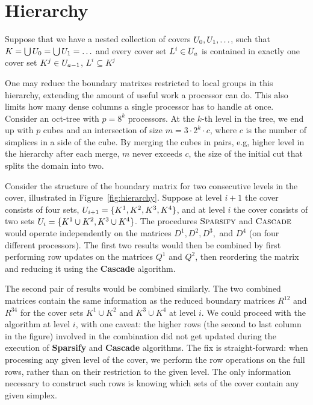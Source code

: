 \section{Hierarchy}
\label{sec:hierarchy}
Suppose that we have a nested collection of
covers $U_0, U_1, \ldots$, such that $K = \bigcup U_0 = \bigcup U_1 = \ldots$
and every cover set $L^i \in U_a$ is contained in exactly one cover set
$K^j \in U_{a-1}$, $L^i \subseteq K^j$

One may reduce the boundary matrixes restricted to local groups in this hierarchy,
extending the amount of useful work a processor can do. This also limits how
many dense columns a single processor has to handle at once.
%
Consider an oct-tree with $p = 8^k$ processors. At the $k$-th level in the
tree, we end up with $p$ cubes and an intersection of size $m = 3 \cdot 2^k \cdot c$,
where $c$ is the number of simplices in a side of the cube. By merging the cubes in pairs, e.g,  higher level
in the hierarchy after each merge, $m$ never exceeds $c$, the size of the
initial cut that splits the domain into two.

Consider the structure of the boundary matrix for two consecutive levels in the
cover, illustrated in Figure~\ref{fig:hierarchy}. Suppose at level $i+1$ the
cover consists of four sets, $U_{i+1} = \{ K^1, K^2, K^3, K^4 \}$, and at level
$i$ the cover consists of two sets $U_i = \{ K^1 \cup K^2, K^3 \cup K^4 \}$.
%
The procedures $\textnormal{\scshape Sparsify}$ and $\textnormal{\scshape Cascade}$ would operate independently
on the matrices $D^1, D^2, D^3,$ and $D^4$ (on four different processors). The first
two results would then be combined by first performing row updates on the matrices $Q^1$ and
$Q^2$, then reordering the matrix and reducing it using the {\bf Cascade}
algorithm.

The second pair of results would be combined similarly.
The two combined matrices contain the same information as the reduced boundary
matrices $R^{12}$ and $R^{34}$ for the cover sets $K^1 \cup K^2$
and $K^3 \cup K^4$ at level $i$. We could proceed with the algorithm at level
$i$, with one caveat: the higher rows (the second to last column in the figure)
involved in the combination did not get updated during the execution of {\bf
Sparsify} and {\bf Cascade} algorithms. The fix is straight-forward: when
processing any given level of the cover, we perform the row operations on the
full rows, rather than on their restriction to the given level.
The only information necessary to construct such rows is knowing which sets of
the cover contain any given simplex.

